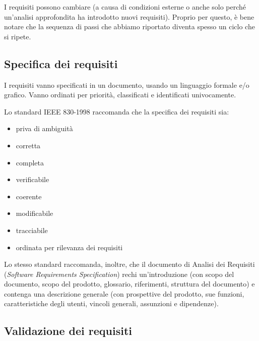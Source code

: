 \documentclass[a4paper]{article}
\begin{document}
		
I requisiti possono cambiare (a causa di condizioni esterne o anche solo perché un'analisi approfondita ha introdotto nuovi requisiti). Proprio per questo, è bene notare che la sequenza di passi che abbiamo riportato diventa spesso un ciclo che si ripete.

		
	\subsection{Specifica dei requisiti}

		
I requisiti vanno specificati in un documento, usando un linguaggio formale e/o grafico. Vanno ordinati per priorità, classificati e identificati univocamente.
		
Lo standard IEEE 830-1998 raccomanda che la specifica dei requisiti sia:
		
	\begin{itemize}
		
			
	\item priva di ambiguità
			
	\item corretta
			
	\item completa
			
	\item verificabile
			
	\item coerente
			
	\item modificabile
			
	\item tracciabile
			
	\item ordinata per rilevanza dei requisiti
		
	\end{itemize}

		
Lo stesso standard raccomanda, inoltre, che il documento di Analisi dei Requisiti (\emph{Software Requirements Specification}) rechi un'introduzione (con scopo del documento, scopo del prodotto, glossario, riferimenti, struttura del documento) e contenga una descrizione generale (con prospettive del prodotto, sue funzioni, caratteristiche degli utenti, vincoli generali, assunzioni e dipendenze).

		
	\subsection{Validazione dei requisiti}
\end{document}
